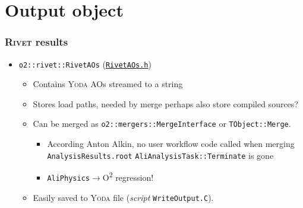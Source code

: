 \documentclass[compress,table,8pt]{beamer}
\newcommand\Rivet{{\scshape Rivet}}
\newcommand\Yoda{{\scshape Yoda}}
\newcommand\Otwo{O\textsuperscript{2}}
\begin{document}
\section{Output object}
\begin{frame}
  \frametitle{\Rivet{} results}
  \begin{itemize}
  \item<+-> \texttt{o2::rivet::RivetAOs}
    (\href{https://https://github.com/cholmcc/O2Physics/tree/cholmcc_pwgmm_rivet/PWGMM/Rivet/Tasks/Wrapper.h}{\texttt{RivetAOs.h}})
    \begin{itemize}
    \item<+-> Contains \Yoda{} AOs streamed to a string
    \item<+-> Stores load paths, needed by merge\newline%
      {\footnotesize perhaps also store compiled sources?}
    \item<+-> Can be merged as
      \texttt{o2::mergers::MergeInterface} or \texttt{TObject::Merge}.
      \begin{itemize}
      \item<+-> According Anton Alkin, no user workflow code called
        when merging \texttt{AnalysisResults.root}\newline%
        {\footnotesize \texttt{AliAnalysisTask::Terminate} is gone}
      \item<+-> \texttt{AliPhysics}$\rightarrow$\Otwo{} regression!
      \end{itemize}
    \item<+-> Easily saved to \Yoda{} file (\emph{script}
      \texttt{WriteOutput.C}).
    \end{itemize}
  \end{itemize}
\end{frame}

\end{document}
